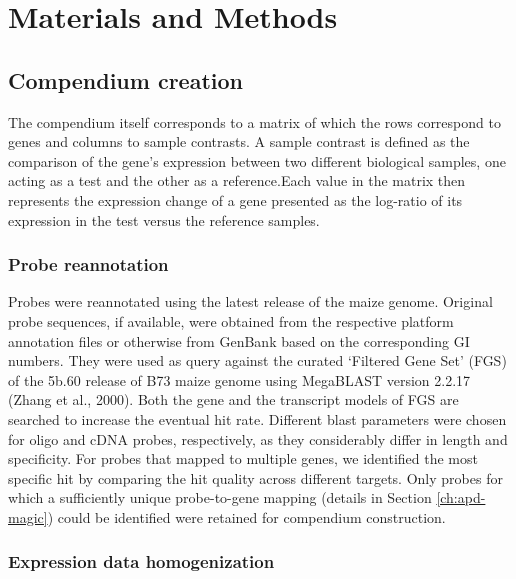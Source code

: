 \section{Materials and Methods}

\subsection{Compendium creation}

The compendium itself corresponds to a matrix of which the rows correspond 
to genes and columns to sample contrasts. A sample contrast is
defined as the comparison of the gene’s expression between two different
biological samples, one acting as a test and the other as a reference.Each
value in the matrix then represents the expression change of a gene presented 
as the log-ratio of its expression in the test versus the reference
samples.

\subsubsection{Probe reannotation} Probes were reannotated using the latest
release of the maize genome. Original probe sequences, if available, were
obtained from the respective platform annotation files or otherwise from
GenBank based on the corresponding GI numbers. They were used as
query against the curated ‘Filtered Gene Set’ (FGS) of the 5b.60 release
of B73 maize genome using MegaBLAST version 2.2.17 (Zhang et al.,
2000). Both the gene and the transcript models of FGS are searched to
increase the eventual hit rate. Different blast parameters were chosen for
oligo and cDNA probes, respectively, as they considerably differ in length
and specificity. For probes that mapped to multiple genes, we identified
the most specific hit by comparing the hit quality across different targets.
Only probes for which a sufficiently unique probe-to-gene mapping (details 
in Section \ref{ch:apd-magic}) could be identified were retained for
compendium construction.

\subsubsection{Expression data homogenization}

